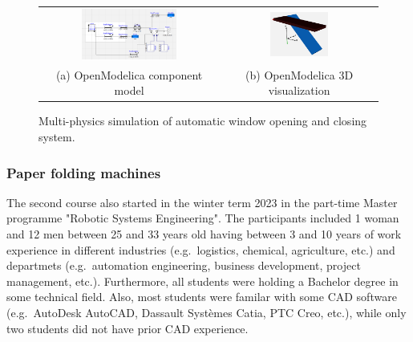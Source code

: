 \documentclass{PDS}
\begin{document}
\begin{figure}[htbp]
    \begin{center}
        \begin{tabular}{cc}
            \includegraphics[width=0.553\textwidth]{./figures/glasshouse_mechatronic_1.png} &
            \includegraphics[width=0.395\textwidth]{./figures/glasshouse_mechatronic_2.png} \\
            (a) OpenModelica component model &
            (b) OpenModelica 3D visualization
        \end{tabular}
    \end{center}
    \caption{Multi-physics simulation of automatic window opening and closing system.}
    \label{fig:glasshouse-sim}
\end{figure}


\subsubsection{Paper folding machines}
\label{sec:master-system-lego}

The second course also started in the winter term 2023 in the part-time Master programme "Robotic Systems Engineering".
The participants included 1 woman and 12 men between 25 and 33 years old having between 3 and 10 years of work experience in different industries (e.g.\ logistics, chemical, agriculture, etc.) and departmets (e.g.\ automation engineering, business development, project management, etc.).
Furthermore, all students were holding a Bachelor degree in some technical field.
Also, most students were familar with some CAD software (e.g.\ AutoDesk AutoCAD, Dassault Systèmes Catia, PTC Creo, etc.), while only two students did not have prior CAD experience.
\end{document}

